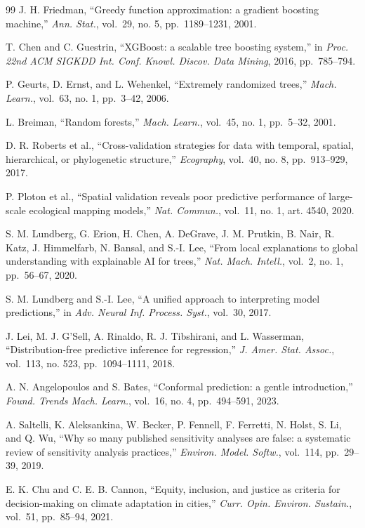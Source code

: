 \documentclass[conference]{IEEEtran}
\begin{document}
\begin{thebibliography}{99}
 J. H. Friedman, ``Greedy function approximation: a gradient boosting machine,'' \emph{Ann. Stat.},
vol.~29, no. 5, pp.~1189--1231, 2001.


 T. Chen and C. Guestrin, ``XGBoost: a scalable tree boosting system,'' in \emph{Proc. 22nd ACM SIGKDD
Int. Conf. Knowl. Discov. Data Mining}, 2016, pp.~785--794.


 P. Geurts, D. Ernst, and L. Wehenkel, ``Extremely randomized trees,'' \emph{Mach. Learn.}, vol.~63,
no. 1, pp.~3--42, 2006.


 L. Breiman, ``Random forests,'' \emph{Mach. Learn.}, vol.~45, no. 1, pp.~5--32, 2001.


 D. R. Roberts et al., ``Cross-validation strategies for data with temporal, spatial, hierarchical,
or phylogenetic structure,'' \emph{Ecography}, vol.~40, no. 8, pp.~913--929, 2017.


 P. Ploton et al., ``Spatial validation reveals poor predictive performance of large-scale ecological
mapping models,'' \emph{Nat. Commun.}, vol.~11, no. 1, art. 4540, 2020.


 S. M. Lundberg, G. Erion, H. Chen, A. DeGrave, J. M. Prutkin, B. Nair, R. Katz, J. Himmelfarb,
N. Bansal, and S.-I. Lee, ``From local explanations to global understanding with explainable AI for
trees,'' \emph{Nat. Mach. Intell.}, vol.~2, no. 1, pp.~56--67, 2020.


 S. M. Lundberg and S.-I. Lee, ``A unified approach to interpreting model predictions,'' in \emph{Adv.
Neural Inf. Process. Syst.}, vol.~30, 2017.


 J. Lei, M. J. G'Sell, A. Rinaldo, R. J. Tibshirani, and L. Wasserman, ``Distribution-free
predictive inference for regression,'' \emph{J. Amer. Stat. Assoc.}, vol.~113, no. 523, pp.~1094--1111, 2018.


 A. N. Angelopoulos and S. Bates, ``Conformal prediction: a gentle introduction,'' \emph{Found. Trends
Mach. Learn.}, vol.~16, no. 4, pp.~494--591, 2023.


 A. Saltelli, K. Aleksankina, W. Becker, P. Fennell, F. Ferretti, N. Holst, S. Li, and Q. Wu, ``Why
so many published sensitivity analyses are false: a systematic review of sensitivity analysis
practices,'' \emph{Environ. Model. Softw.}, vol.~114, pp.~29--39, 2019.


 E. K. Chu and C. E. B. Cannon, ``Equity, inclusion, and justice as criteria for decision-making on
climate adaptation in cities,'' \emph{Curr. Opin. Environ. Sustain.}, vol.~51, pp.~85--94, 2021.



\end{thebibliography}
\end{document}
